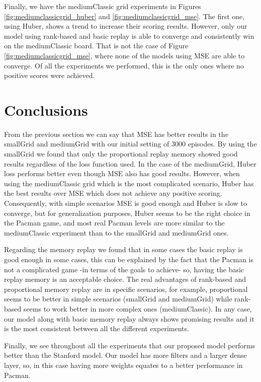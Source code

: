 \documentclass[conference]{IEEEtran}
\begin{document}
Finally, we have the mediumClassic grid experiments in Figures \ref{fig:mediumclassicgrid_huber} and \ref{fig:mediumclassicgrid_mse}. The first one, using Huber, shows a trend to increase their scoring results. However, only our model using rank-based and basic replay is able to converge and consistently win on the mediumClassic board. That is not the case of Figure \ref{fig:mediumclassicgrid_mse}, where none of the models using MSE are able to converge. Of all the experiments we performed, this is the only ones where no positive scores were achieved.



\section{Conclusions}

From the previous section we can say that MSE has better results in the smallGrid and mediumGrid with our initial setting of 3000 episodes. By using the smallGrid we found that only the proportional replay memory showed good results regardless of the loss function used. In the case of the mediumGrid, Huber loss performs better even though MSE also has good results. However, when using the mediumClassic grid which is the most complicated scenario, Huber has the best results over MSE which does not achieve any positive scoring. Consequently, with simple scenarios MSE is good enough and Huber is slow to converge, but for generalization purposes, Huber seems to be the right choice in the Pacman game, and most real Pacman levels are more similar to the mediumClassic experiment than to the smallGrid and mediumGrid ones.

Regarding the memory replay we found that in some cases the basic replay is good enough in some cases, this can be explained by the fact that the Pacman is not a complicated game -in terms of the goals to achieve- so, having the basic replay memory is an acceptable choice. The real advantages of rank-based and proportional memory replay are in specific scenarios, for example, proportional seems to be better in simple scenarios (smallGrid and mediumGrid) while rank-based seems to work better in more complex ones (mediumClassic). In any case, our model along with basic memory replay always shows promising results and it is the most consistent between all the different experiments.

Finally, we see throughout all the experiments that our proposed model performs better than the Stanford model. Our model has more filters and a larger dense layer, so, in this case having more weights equates to a better performance in Pacman.
\end{document}
